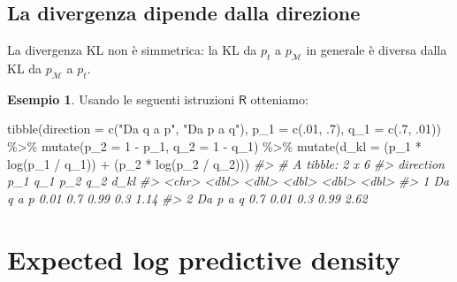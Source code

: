 \documentclass[
  10pt,
  italian,
  a4paper,
  extrafontsizes,onecolumn,openright
  ]{memoir}
\newenvironment{Shaded}{\begin{snugshade}}{\end{snugshade}}
\newcommand{\AttributeTok}[1]{\textcolor[rgb]{0.77,0.63,0.00}{#1}}
\newcommand{\CommentTok}[1]{\textcolor[rgb]{0.56,0.35,0.01}{\textit{#1}}}
\newcommand{\DecValTok}[1]{\textcolor[rgb]{0.00,0.00,0.81}{#1}}
\newcommand{\FunctionTok}[1]{\textcolor[rgb]{0.00,0.00,0.00}{#1}}
\newcommand{\NormalTok}[1]{#1}
\newcommand{\SpecialCharTok}[1]{\textcolor[rgb]{0.00,0.00,0.00}{#1}}
\newcommand{\StringTok}[1]{\textcolor[rgb]{0.31,0.60,0.02}{#1}}
\newcommand{\R}{\textsf{R}} %
\theoremstyle{definition}
\theoremstyle{definition}
\newtheorem{example}{Esempio}[chapter]
\theoremstyle{definition}
\theoremstyle{definition}
\theoremstyle{remark}
\begin{document}
\hypertarget{la-divergenza-dipende-dalla-direzione}{%
\subsection{La divergenza dipende dalla direzione}\label{la-divergenza-dipende-dalla-direzione}}

La divergenza KL non è simmetrica: la KL da \(p_t\) a \(p_{\mathcal{M}}\) in generale è diversa dalla KL da \(p_{\mathcal{M}}\) a \(p_t\).

\begin{example}

Usando le seguenti istruzioni \(\R\) otteniamo:

\begin{Shaded}
\begin{Highlighting}[]
\FunctionTok{tibble}\NormalTok{(}\AttributeTok{direction =} \FunctionTok{c}\NormalTok{(}\StringTok{"Da q a p"}\NormalTok{, }\StringTok{"Da p a q"}\NormalTok{),}
       \AttributeTok{p\_1 =} \FunctionTok{c}\NormalTok{(.}\DecValTok{01}\NormalTok{, .}\DecValTok{7}\NormalTok{),}
       \AttributeTok{q\_1 =} \FunctionTok{c}\NormalTok{(.}\DecValTok{7}\NormalTok{, .}\DecValTok{01}\NormalTok{)) }\SpecialCharTok{\%\textgreater{}\%}
  \FunctionTok{mutate}\NormalTok{(}\AttributeTok{p\_2 =} \DecValTok{1} \SpecialCharTok{{-}}\NormalTok{ p\_1,}
         \AttributeTok{q\_2 =} \DecValTok{1} \SpecialCharTok{{-}}\NormalTok{ q\_1) }\SpecialCharTok{\%\textgreater{}\%}
  \FunctionTok{mutate}\NormalTok{(}\AttributeTok{d\_kl =}\NormalTok{ (p\_1 }\SpecialCharTok{*} \FunctionTok{log}\NormalTok{(p\_1 }\SpecialCharTok{/}\NormalTok{ q\_1)) }\SpecialCharTok{+}\NormalTok{ (p\_2 }\SpecialCharTok{*} \FunctionTok{log}\NormalTok{(p\_2 }\SpecialCharTok{/}\NormalTok{ q\_2)))}
\CommentTok{\#\textgreater{} \# A tibble: 2 x 6}
\CommentTok{\#\textgreater{}   direction   p\_1   q\_1   p\_2   q\_2  d\_kl}
\CommentTok{\#\textgreater{}   \textless{}chr\textgreater{}     \textless{}dbl\textgreater{} \textless{}dbl\textgreater{} \textless{}dbl\textgreater{} \textless{}dbl\textgreater{} \textless{}dbl\textgreater{}}
\CommentTok{\#\textgreater{} 1 Da q a p   0.01  0.7   0.99  0.3   1.14}
\CommentTok{\#\textgreater{} 2 Da p a q   0.7   0.01  0.3   0.99  2.62}
\end{Highlighting}
\end{Shaded}

\end{example}

\hypertarget{expected-log-predictive-density}{%
\section{Expected log predictive density}\label{expected-log-predictive-density}}
\end{document}
